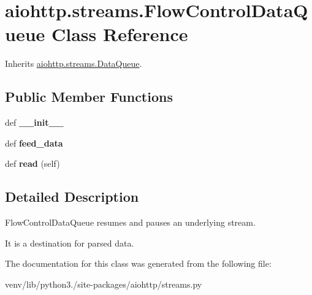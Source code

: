 \hypertarget{classaiohttp_1_1streams_1_1_flow_control_data_queue}{}\section{aiohttp.\+streams.\+Flow\+Control\+Data\+Queue Class Reference}
\label{classaiohttp_1_1streams_1_1_flow_control_data_queue}


Inherits \hyperlink{classaiohttp_1_1streams_1_1_data_queue}{aiohttp.\+streams.\+Data\+Queue}.

\subsection*{Public Member Functions}
\begin{DoxyCompactItemize}
\item 
\mbox{\label{classaiohttp_1_1streams_1_1_flow_control_data_queue_a1a9a5e89aef98418d805d501146d4b09}} 
def {\bfseries \+\_\+\+\_\+init\+\_\+\+\_\+}
\item 
\mbox{\label{classaiohttp_1_1streams_1_1_flow_control_data_queue_ad418d73080da48eb188e531c93ed8c8f}} 
def {\bfseries feed\+\_\+data}
\item 
\mbox{\label{classaiohttp_1_1streams_1_1_flow_control_data_queue_a8594557d977399f11962bd2913f60116}} 
def {\bfseries read} (self)
\end{DoxyCompactItemize}


\subsection{Detailed Description}
\begin{DoxyVerb}FlowControlDataQueue resumes and pauses an underlying stream.

It is a destination for parsed data.\end{DoxyVerb}
 

The documentation for this class was generated from the following file\+:\begin{DoxyCompactItemize}
\item 
venv/lib/python3./site-\/packages/aiohttp/streams.\+py\end{DoxyCompactItemize}
